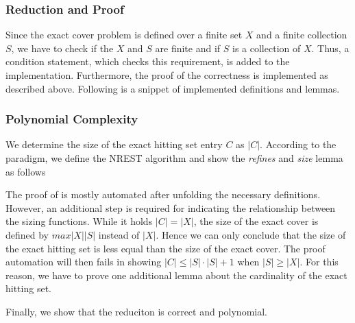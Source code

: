 \subsubsection{Reduction and Proof}
Since the exact cover problem is defined over a finite set $X$ and a finite collection $S$, we have to check if the $X$ and $S$ are finite and 
if $S$ is a collection of $X$. Thus, a condition statement, which checks this requirement, is added to the implementation. Furthermore,
the proof of the correctness is implemented as described above. Following is a snippet of implemented definitions and lemmas.

\subsubsection{Polynomial Complexity}
We determine the size of the exact hitting set entry $C$ as $|C|$. According to the paradigm, 
we define the NREST algorithm and show the \textit{refines} and \textit{size} lemma as follows


The proof of is mostly automated after unfolding the necessary definitions. 
However, an additional step is required for indicating the relationship between the sizing functions. 
While it holds $|C| = |X|$, 
the size of the exact cover is defined by $max |X| |S|$ instead of $|X|$. Hence we can
only conclude that the size of the exact hitting set is less equal than the size of the exact cover. 
The proof automation will then fails in showing $|C| \leq |S| \cdot |S| + 1$ when $|S| \geq |X|$. 
For this reason, we have to prove one additional lemma about the cardinality of the 
exact hitting set.


Finally, we show that the reduciton is correct and polynomial. 






